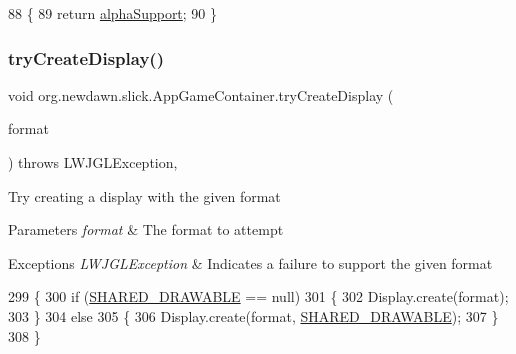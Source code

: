\begin{DoxyCode}
88                                                \{
89         \textcolor{keywordflow}{return} \mbox{\hyperlink{classorg_1_1newdawn_1_1slick_1_1_app_game_container_a303ad9792836be5d1fdb1d0ef60da05c}{alphaSupport}};
90     \}
\end{DoxyCode}
\mbox{\label{classorg_1_1newdawn_1_1slick_1_1_app_game_container_a8e3abb23c231a0262715aa22dea9f3bd}} 
\subsubsection{\texorpdfstring{try\+Create\+Display()}{tryCreateDisplay()}}
{\footnotesize\ttfamily void org.\+newdawn.\+slick.\+App\+Game\+Container.\+try\+Create\+Display (\begin{DoxyParamCaption}\item[{Pixel\+Format}]{format }\end{DoxyParamCaption}) throws L\+W\+J\+G\+L\+Exception\hspace{0.3cm}{\ttfamily [inline]}, {\ttfamily [private]}}

Try creating a display with the given format


\begin{DoxyParams}{Parameters}
{\em format} & The format to attempt \\
\hline
\end{DoxyParams}

\begin{DoxyExceptions}{Exceptions}
{\em L\+W\+J\+G\+L\+Exception} & Indicates a failure to support the given format \\
\hline
\end{DoxyExceptions}

\begin{DoxyCode}
299                                                                             \{
300         \textcolor{keywordflow}{if} (\mbox{\hyperlink{classorg_1_1newdawn_1_1slick_1_1_game_container_ac1844f34fb7c738852219330998424a3}{SHARED\_DRAWABLE}} == null) 
301         \{
302             Display.create(format);
303         \}
304         \textcolor{keywordflow}{else}
305         \{
306             Display.create(format, \mbox{\hyperlink{classorg_1_1newdawn_1_1slick_1_1_game_container_ac1844f34fb7c738852219330998424a3}{SHARED\_DRAWABLE}});
307         \}
308     \}
\end{DoxyCode}


